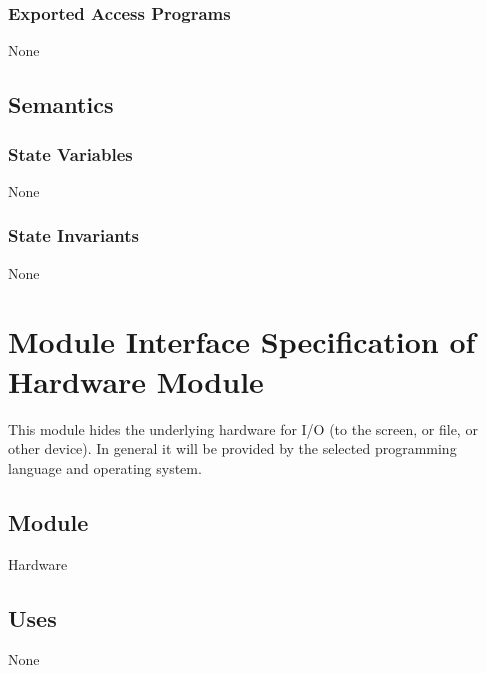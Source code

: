 \documentclass[12pt]{article}
\begin{document}
\subsubsection{Exported Access Programs}
\label{Sec:ExpAccPrograms}
None
\subsection{Semantics}
\label{Sec:Semantics}
\subsubsection{State Variables}
\label{Sec:StateVars}
None
\subsubsection{State Invariants}
\label{Sec:StateInvars}
None
\section{Module Interface Specification of Hardware Module}
\label{Sec:Hardware}
This module hides the underlying hardware for I/O (to the screen, or file, or other device). In general it will be provided by the selected programming language and operating system.
\subsection{Module}
\label{Sec:Module}
Hardware
\subsection{Uses}
\label{Sec:Uses}
None
\end{document}
